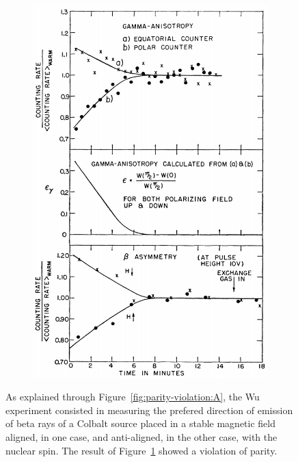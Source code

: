 \begin{figure}[H]
\begin{subfigure}{0.4\linewidth}
			\includegraphics[width=0.5\plotwidth]{fig/chapt2/Wu_result.png}
			\caption{\label{fig:parity-violation:B}}
		\end{subfigure}
		\caption{\label{fig:parity-violation} As explained through Figure~\ref{fig:parity-violation:A}, the Wu experiment consisted in measuring the prefered direction of emission of beta rays of a Colbalt source placed in a stable magnetic field aligned, in one case, and anti-aligned, in the other case, with the nuclear spin. The result of Figure~\ref{fig:parity-violation:B} showed a violation of parity.}
	\end{figure}
	
